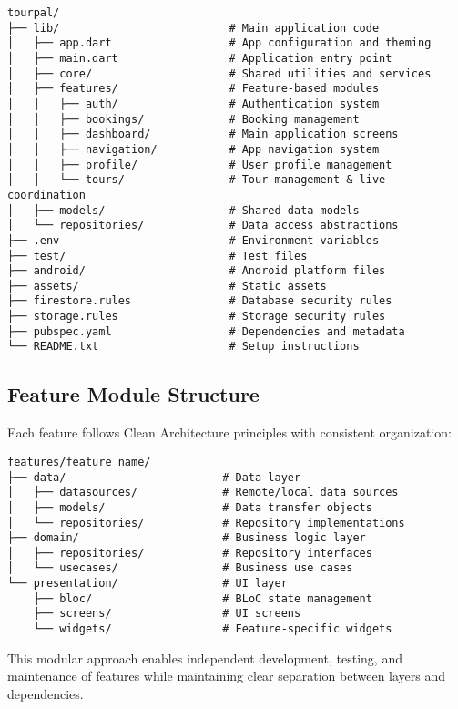 \documentclass[12pt,a4paper]{article}
\begin{document}
\begin{verbatim}
tourpal/
├── lib/                          # Main application code
│   ├── app.dart                  # App configuration and theming
│   ├── main.dart                 # Application entry point
│   ├── core/                     # Shared utilities and services
│   ├── features/                 # Feature-based modules
│   │   ├── auth/                 # Authentication system
│   │   ├── bookings/             # Booking management
│   │   ├── dashboard/            # Main application screens
│   │   ├── navigation/           # App navigation system
│   │   ├── profile/              # User profile management
│   │   └── tours/                # Tour management & live coordination
│   ├── models/                   # Shared data models
│   └── repositories/             # Data access abstractions
├── .env                          # Environment variables
├── test/                         # Test files
├── android/                      # Android platform files
├── assets/                       # Static assets
├── firestore.rules               # Database security rules
├── storage.rules                 # Storage security rules
├── pubspec.yaml                  # Dependencies and metadata
└── README.txt                    # Setup instructions
\end{verbatim}

\subsection{Feature Module Structure}

Each feature follows Clean Architecture principles with consistent organization:

\begin{verbatim}
features/feature_name/
├── data/                        # Data layer
│   ├── datasources/             # Remote/local data sources
│   ├── models/                  # Data transfer objects
│   └── repositories/            # Repository implementations
├── domain/                      # Business logic layer
│   ├── repositories/            # Repository interfaces
│   └── usecases/                # Business use cases
└── presentation/                # UI layer
    ├── bloc/                    # BLoC state management
    ├── screens/                 # UI screens
    └── widgets/                 # Feature-specific widgets
\end{verbatim}

This modular approach enables independent development, testing, and maintenance of features while maintaining clear separation between layers and dependencies.
\end{document}
